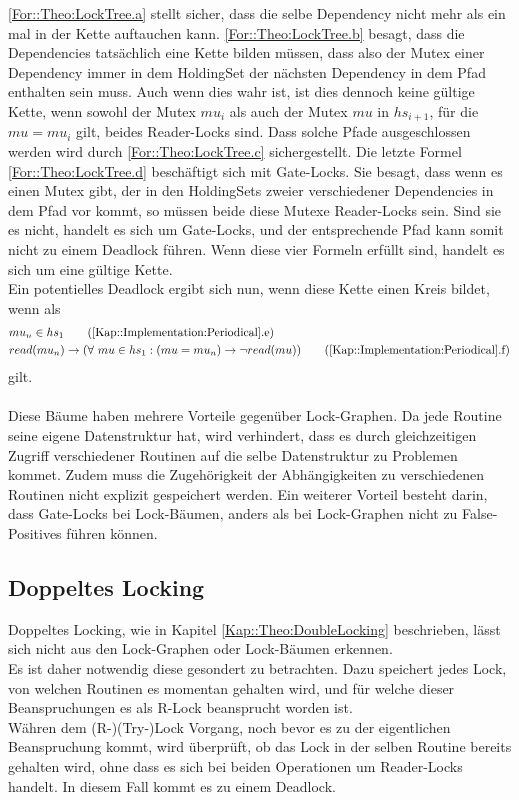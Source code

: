 \eqref{For::Theo:LockTree.a} stellt sicher, dass die selbe 
Dependency nicht mehr als ein mal in der Kette auftauchen kann.  
\eqref{For::Theo:LockTree.b} besagt, dass die Dependencies tatsächlich
eine Kette bilden müssen, dass also der Mutex einer Dependency immer in dem 
HoldingSet der nächsten Dependency in dem Pfad enthalten sein muss. 
Auch wenn dies wahr ist, ist dies dennoch keine gültige Kette, wenn sowohl der
Mutex $mu_i$ als auch der Mutex $mu$ in $hs_{i+1}$, für die $mu = mu_i$ gilt, 
beides Reader-Locks sind. Dass solche Pfade ausgeschlossen werden wird durch 
\eqref{For::Theo:LockTree.c} sichergestellt. Die letzte Formel 
\eqref{For::Theo:LockTree.d} beschäftigt sich mit Gate-Locks. 
Sie besagt, dass wenn es einen Mutex gibt, 
der in den HoldingSets zweier verschiedener Dependencies in dem Pfad vor kommt, 
so müssen beide diese Mutexe Reader-Locks sein. Sind sie es nicht, handelt es 
sich um Gate-Locks, und der entsprechende Pfad kann somit nicht zu einem 
Deadlock führen. Wenn diese vier Formeln erfüllt sind, handelt es sich um eine 
gültige Kette.\\
Ein potentielles Deadlock ergibt sich nun, wenn diese Kette einen Kreis 
bildet, wenn als 
\begin{align}
  &mu_n \in hs_{1} 
  \tag{\ref{Kap::Implementation:Periodical}.e}
  \label{For::Implementation:Periodical.e}\\
  &read(mu_n) \rightarrow 
  (\forall\ mu \in hs_{1}: (mu = mu_n) \to \lnot read(mu))
  \tag{\ref{Kap::Implementation:Periodical}.f}
  \label{For::Implementation:Periodical.f}
\end{align}
gilt.\\\\
Diese Bäume haben mehrere Vorteile gegenüber Lock-Graphen. Da jede Routine seine 
eigene Datenstruktur hat, wird verhindert, dass es durch 
gleichzeitigen Zugriff verschiedener Routinen auf die selbe Datenstruktur zu 
Problemen kommet. Zudem muss die Zugehörigkeit der Abhängigkeiten zu 
verschiedenen Routinen nicht explizit gespeichert werden. Ein weiterer Vorteil 
besteht darin, dass Gate-Locks bei Lock-Bäumen, anders als bei Lock-Graphen
nicht zu False-Positives führen können.


\subsection{Doppeltes Locking}
Doppeltes Locking, wie in Kapitel \ref{Kap::Theo:DoubleLocking} beschrieben,
 lässt sich nicht aus den Lock-Graphen oder Lock-Bäumen erkennen.\\
Es ist daher notwendig diese gesondert zu betrachten. Dazu speichert jedes Lock, 
von welchen Routinen es momentan gehalten wird, und für welche dieser 
Beanspruchungen es als R-Lock beansprucht worden ist.\\
Währen dem (R-)(Try-)Lock Vorgang, noch bevor es zu der eigentlichen Beanspruchung 
kommt, wird überprüft, ob das Lock in der selben Routine bereits gehalten 
wird, ohne dass es sich bei beiden Operationen um Reader-Locks handelt. In diesem 
Fall kommt es zu einem Deadlock.


